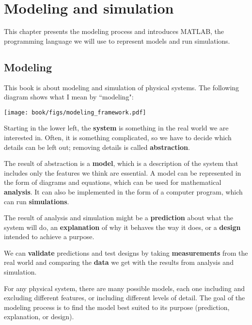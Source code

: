 \documentclass[main.tex]{subfiles}
\begin{document}
\chapter{Modeling and simulation}
\label{chpt:modeling}

This chapter presents the modeling process and introduces MATLAB, the programming language we will use to represent models and run simulations.


\section{Modeling}

This book is about modeling and simulation of physical systems.  
The following diagram shows what I mean by ``modeling":


\vspace{0.2in}
\centerline{\texttt{[image: book/figs/modeling\_framework.pdf]}}

Starting in the lower left, the {\bf system} is something in the real world we are interested in.  
Often, it is something complicated, so we have to decide which 
details can be left out; removing details is called {\bf abstraction}.  


The result of abstraction is a {\bf model}, which is a description of the system that includes only the features we think are essential.  A model can be represented in the form of diagrams and equations, which can be used for mathematical {\bf analysis}.  It can also be implemented in the form of a computer program, which can run {\bf simulations}.


The result of analysis and simulation might be a {\bf prediction} about what the system will do, an {\bf explanation} of why it behaves the way it does, or a {\bf design} intended to achieve a purpose.


We can {\bf validate} predictions and test designs by taking {\bf measurements} from the real world and comparing the {\bf data} we get with the results from analysis and simulation. 


For any physical system, there are many possible models, each one including and excluding different features, or including different levels of detail.  The goal of the modeling process is to find the model best suited to its purpose (prediction, explanation, or design).
\end{document}
